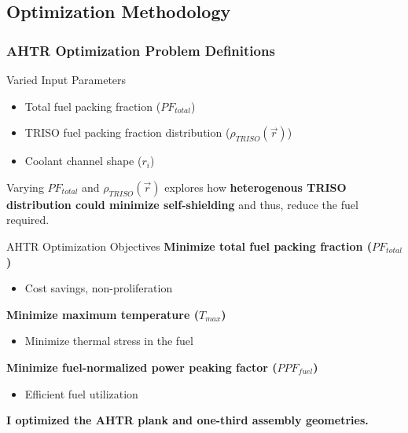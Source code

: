 \subsection{Optimization Methodology}
\begin{frame}
    \frametitle{AHTR Optimization Problem Definitions}
    \vspace{-0.2cm}
    \begin{block}{Varied Input Parameters}
        \begin{itemize}
            \item Total fuel packing fraction ($PF_{total}$)
            \item TRISO fuel packing fraction distribution ($\rho_{TRISO}(\vec{r})$)
            \item Coolant channel shape ($r_i$)
        \end{itemize}
        Varying $PF_{total}$ and $\rho_{TRISO}(\vec{r})$ explores how \textbf{heterogenous 
        TRISO distribution could minimize self-shielding} and thus, reduce the fuel 
        required.
    \end{block}
    \vspace{-0.3cm}
    \begin{block}{AHTR Optimization Objectives}
     \textbf{Minimize total fuel packing fraction ($PF_{total}$)}
     \begin{itemize}
        \item Cost savings, non-proliferation 
     \end{itemize}
     \textbf{Minimize maximum temperature ($T_{max}$)}
     \begin{itemize}
        \item Minimize thermal stress in the fuel 
     \end{itemize}
     \textbf{Minimize fuel-normalized power peaking factor ($PPF_{fuel}$)} 
     \begin{itemize}
        \item Efficient fuel utilization
     \end{itemize}
    \end{block}
    \textbf{I optimized the AHTR plank and one-third assembly geometries.} 
\end{frame}

